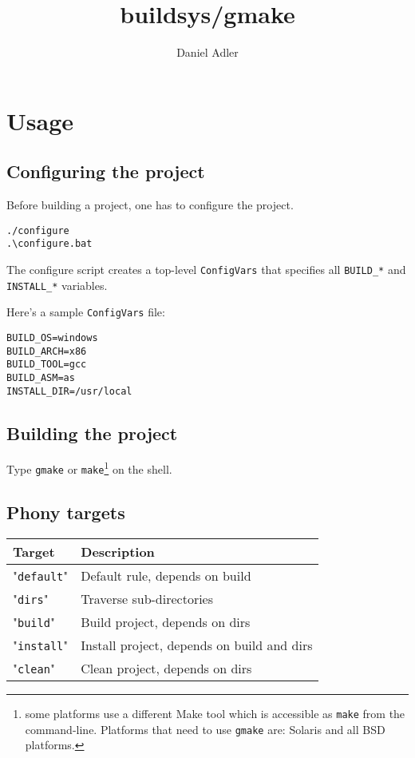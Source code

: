 \documentclass{article}
\newcommand{\var}[1]{{\tt #1}}
\newcommand{\val}[1]{"{\tt #1}"}
\newcommand{\file}[1]{{\tt #1}}
\begin{document}
\title{buildsys/gmake}
\author{Daniel Adler}
\maketitle

\section{Usage}

\subsection{Configuring the project}

Before building a project, one has to configure the project.

\begin{verbatim}
./configure
.\configure.bat
\end{verbatim}

The configure script creates a top-level \file{ConfigVars} that
specifies all \var{BUILD\_*} and \var{INSTALL\_*} variables.

Here's a sample \file{ConfigVars} file:

\begin{verbatim}
BUILD_OS=windows
BUILD_ARCH=x86
BUILD_TOOL=gcc
BUILD_ASM=as
INSTALL_DIR=/usr/local
\end{verbatim}

\subsection{Building the project}

Type {\tt gmake} or {\tt make}\footnote{some platforms use a different Make tool which is accessible as
{\tt make} from the command-line. Platforms that need to use {\tt gmake} are: Solaris and all BSD platforms.} on the shell.

\subsection{Phony targets}

\begin{tabular}{ll}
Target  & Description				\\
\hline
\val{default}	& Default rule, depends on build	\\
\val{dirs}	& Traverse sub-directories		\\
\val{build}	& Build project, depends on dirs	\\
\val{install}	& Install project, depends on build and dirs \\
\val{clean}	& Clean project, depends on dirs	\\
\end{tabular}
\end{document}
